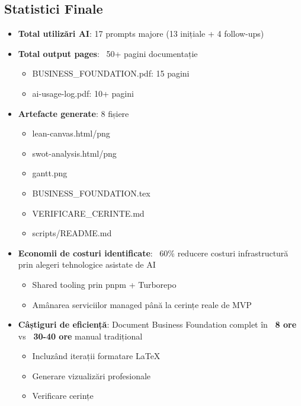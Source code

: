 \documentclass[11pt,a4paper]{article}
\begin{document}
\subsection{Statistici Finale}

\begin{itemize}[leftmargin=*]
    \item \textbf{Total utilizări AI}: 17 prompts majore (13 inițiale + 4 follow-ups)
    \item \textbf{Total output pages}: ~50+ pagini documentație
    \begin{itemize}
        \item BUSINESS\_FOUNDATION.pdf: 15 pagini
        \item ai-usage-log.pdf: 10+ pagini
    \end{itemize}
    \item \textbf{Artefacte generate}: 8 fișiere
    \begin{itemize}
        \item lean-canvas.html/png
        \item swot-analysis.html/png
        \item gantt.png
        \item BUSINESS\_FOUNDATION.tex
        \item VERIFICARE\_CERINTE.md
        \item scripts/README.md
    \end{itemize}
    \item \textbf{Economii de costuri identificate}: ~60\% reducere costuri infrastructură prin alegeri tehnologice asistate de AI
    \begin{itemize}
        \item Shared tooling prin pnpm + Turborepo
        \item Amânarea serviciilor managed până la cerințe reale de MVP
    \end{itemize}
    \item \textbf{Câștiguri de eficiență}: Document Business Foundation complet în \textbf{~8 ore} vs \textbf{~30-40 ore} manual tradițional
    \begin{itemize}
        \item Incluzând iterații formatare LaTeX
        \item Generare vizualizări profesionale
        \item Verificare cerințe
    \end{itemize}
\end{itemize}
\end{document}
